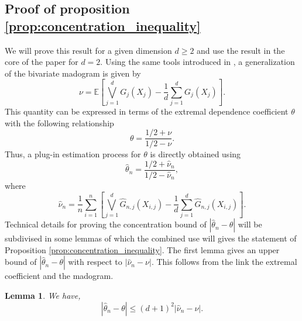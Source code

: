 \documentclass[11pt]{article}
\newtheorem{lemma}{Lemma}
\theoremstyle{definition}
\begin{document}
	\subsection{Proof of proposition \ref{prop:concentration_inequality}}
	\label{subsec:proof_concent_ineq}
	We will prove this result for a given dimension $d \geq 2$ and use the result in the core of the paper for $d=2$. Using the same tools introduced in \cite{MARCON20171}, a generalization of the bivariate madogram is given by
	\begin{equation*}
		\nu = \mathbb{E}\left[ \bigvee_{j=1}^d G_j(X_j) - \frac{1}{d} \sum_{j=1}^d G_j(X_j) \right].
	\end{equation*}
	This quantity can be expressed in terms of the extremal dependence coefficient $\theta$ with the following relationship
	\begin{equation*}
		\theta = \frac{1/2 + \nu}{1/2 - \nu}.
	\end{equation*}
	Thus, a plug-in estimation process for $\theta$ is directly obtained using
	\begin{equation*}
		\hat{\theta}_n = \frac{1/2 + \hat{\nu}_n}{1/2 - \hat{\nu}_n},
	\end{equation*}
	where 
	\begin{equation*}
		\hat{\nu}_n = \frac{1}{n} \sum_{i=1}^n \left[ \bigvee_{j=1}^d \hat{G}_{n,j}(X_{i,j}) - \frac{1}{d} \sum_{j=1}^d \hat{G}_{n,j}(X_{i,j}) \right].
	\end{equation*}
	Technical details for proving the concentration bound of $|\hat{\theta}_n - \theta|$ will be subdivised in some lemmas of which the combined use will gives the statement of Proposition \ref{prop:concentration_inequality}. The first lemma gives an upper bound of $|\hat{\theta}_n - \theta|$ with respect to $|\hat{\nu}_n - \nu|$. This follows from the link the extremal coefficient and the madogram.
	\begin{lemma}
		\label{lem:upper_bounds_ext_coeff}
		We have,
		\begin{equation*}
			|\hat{\theta}_n - \theta| \leq (d+1)^2 |\hat{\nu}_n - \nu |.
		\end{equation*}
	\end{lemma}
\end{document}
